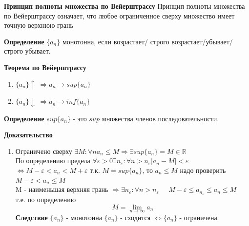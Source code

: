 \documentclass[12pt, paper]{article}
\newcommand{\R}{\mathbb{R}}
\begin{document}
\begin{tcolorbox}
    \textbf{Принцип полноты множества по Вейерштрассу}
    Принцип полноты множества по Вейерштрассу означает, что любое ограниченное сверху множество имеет точную верхнюю грань     
\end{tcolorbox}

\begin{tcolorbox}
    \textbf{Определение}
    $\{a_n\}$ монотонна, если возрастает/ строго возрастает/убывает/строго убывает.
\end{tcolorbox}

\begin{tcolorbox}
    \textbf{Теорема по Вейерштрассу}
    \begin{enumerate}
        \item $\{a_n\} \uparrow \; \Rightarrow a_n \to sup\{ a_n \}$
        \item $\{a_n\} \downarrow \; \Rightarrow a_n \to inf\{ a_n \}$
    \end{enumerate}
\end{tcolorbox}

\begin{tcolorbox}
    \textbf{Определение}
    $sup \{a_n\}$ - это $sup$ множества членов последовательности.
\end{tcolorbox}

\begin{tcolorbox}[title=Доказательство полноты $\R$ по Вейерштрассу]
    \textbf{Доказательство}
    \begin{enumerate}
        \item Ограничено сверху $\exists M: \forall n a_n \leq M \Rightarrow \exists sup\{a_n\} = M \in \R$\\
        По определению предела $\forall \varepsilon > 0 \exists n_\varepsilon: \forall n > n_\varepsilon |a_n - M| < \varepsilon $\\
        $\Leftrightarrow M-\varepsilon<a_n<M+\varepsilon$ т.к. $M=sup\{a_n\}$, то $a_n \leq M$ надо проверить $M-\varepsilon<a_n\leq M$\\
        M - наименьшая верхняя грань $\Rightarrow \exists n_\varepsilon: \forall n > n_\varepsilon \;\;\;\;\; M-\varepsilon \leq a_{n_\varepsilon} \leq a_n \leq M $\\
        т.е. по определению 
        \[M = \lim_{n\to\infty} a_n\]
        \textbf{Следствие} $\{a_n\}$ - монотонна $\{a_n\}$ - сходится $\Leftrightarrow \{a_n\}$ - ограничена.
    \end{enumerate}
\end{tcolorbox}
\end{document}
